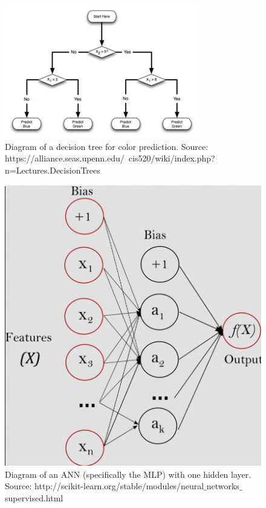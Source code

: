 \documentclass[12pt]{article}
\begin{document}
\begin{figure}[h!]
\begin{center}
\includegraphics[scale=0.7]{DecisionTree_Classification_Graphic_small.png}
\caption{Diagram of a decision tree for color prediction. Source: https://alliance.seas.upenn.edu/~cis520/wiki/index.php?n=Lectures.DecisionTrees}
\label{DTdiagram}
\end{center}
\end{figure}

\begin{figure}[h!]
\begin{center}
\includegraphics[scale=0.3]{multilayerperceptron_network.png}
\caption{Diagram of an ANN (specifically the MLP) with one hidden layer. Source: http://scikit-learn.org/stable/modules/neural$\_$networks$\_$supervised.html}
\label{MLPdiagram}
\end{center}
\end{figure}
\end{document}
